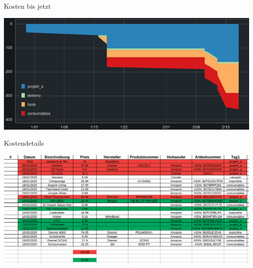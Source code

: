 \documentclass{beamer}
\begin{document}
\begin{frame}{Kosten bis jetzt}

\begin{center}
    \includegraphics[width=\textwidth]{fig_kniffelbot_kosten}
\end{center}

\end{frame}


\begin{frame}{Kostendetails}

\begin{center}
    \includegraphics[width=\textwidth]{fig_kniffelbot_kosten_details}
\end{center}


\end{frame}
\end{document}
